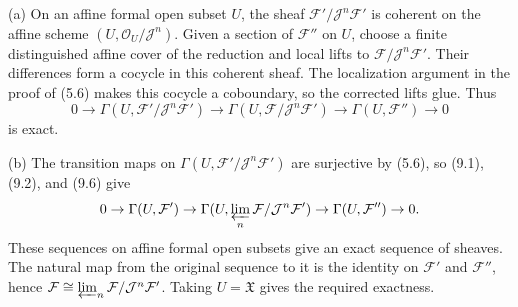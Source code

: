 (a) On an affine formal open subset $U$, the sheaf $\mathcal F'/\mathcal J^n\mathcal F'$ is coherent on the affine scheme $(U,\mathcal O_U/\mathcal J^n)$. Given a section of $\mathcal F''$ on $U$, choose a finite distinguished affine cover of the reduction and local lifts to $\mathcal F/\mathcal J^n\mathcal F'$. Their differences form a cocycle in this coherent sheaf. The localization argument in the proof of (5.6) makes this cocycle a coboundary, so the corrected lifts glue. Thus
\[0\to\Gamma(U,\mathcal F'/\mathcal J^n\mathcal F')\to\Gamma(U,\mathcal F/\mathcal J^n\mathcal F')\to\Gamma(U,\mathcal F'')\to0\]
 is exact.

(b) The transition maps on $\Gamma(U,\mathcal F'/\mathcal J^n\mathcal F')$ are surjective by (5.6), so (9.1), (9.2), and (9.6) give
\[0\to\Gamma(U,\mathcal F')\to\Gamma(U,\varprojlim_n\mathcal F/\mathcal J^n\mathcal F')\to\Gamma(U,\mathcal F'')\to0.\]
These sequences on affine formal open subsets give an exact sequence of sheaves. The natural map from the original sequence to it is the identity on $\mathcal F'$ and $\mathcal F''$, hence $\mathcal F\cong\varprojlim_n\mathcal F/\mathcal J^n\mathcal F'$. Taking $U=\mathfrak X$ gives the required exactness.
